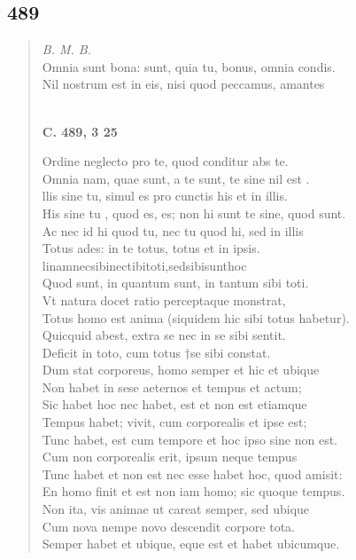 \documentclass[11pt, a4paper]{report}
\begin{document}
            \subsection*{489}
      \begin{verse}
      \textit{B. M. B.} \\ Omnia sunt bona: sunt, quia tu, bonus, omnia condis. \\ Nil nostrum est in eis, nisi quod peccamus, amantes \\ 
        ﻿\pagebreak 
    \begin{center} \textbf{C. 489, 3 25} \end{center}Ordine neglecto pro te, quod conditur abs te. \\ Omnia nam, quae sunt, a te sunt, te sine nil  \lbrack est \rbrack . \\ llis sine tu, simul es pro cunctis his et in illis. \\ His sine  \lbrack tu \rbrack , quod es, es; non hi sunt te sine, quod sunt. \\ Ac nec id hi quod tu, nec tu quod hi, sed in illis \\ Totus ades: in te totus, totus et in ipsis. \\ linamnecsibinectibitoti,sedsibisunthoc \\ Quod sunt, in quantum sunt, in tantum sibi toti. \\ Vt natura docet ratio perceptaque monstrat, \\ Totus homo est anima (siquidem hic sibi totus habetur). \\ Quicquid abest, extra se nec in se sibi sentit. \\ Deficit in toto, cum totus †se sibi constat. \\ Dum stat corporeus, homo semper et hic et ubique \\ Non habet in sese aeternos et tempus et actum; \\ Sic habet hoc nec habet, est et non est etiamque \\ Tempus habet; vivit, cum corporealis et ipse est; \\ Tunc habet, est cum tempore et hoc ipso sine non est. \\ Cum non corporealis erit, ipsum neque tempus \\ Tunc habet et non est nec esse habet hoc, quod amisit: \\ En homo finit et est non iam homo; sic quoque tempus. \\ Non ita, vis animae ut careat semper, sed ubique \\ Cum nova nempe novo descendit corpore tota. \\ Semper habet et ubique, eque est et habet ubicumque. \\ 

\end{verse}
\end{document}
